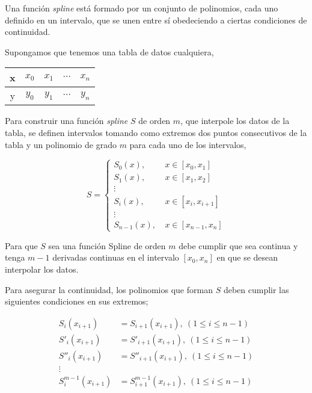 \begin{paracol}{2}
Una función \emph{spline} está formado por un conjunto de polinomios, cada uno definido en un intervalo, que se unen entre sí obedeciendo a ciertas condiciones de continuidad.

Supongamos que tenemos una tabla de datos cualquiera,
\end{paracol}
\begin{table}[h]
\centering
\begin{tabular}{c|cccc}
x&$x_0$&$x_1$&$\cdots$&$x_n$\\
\hline
y&$y_0$&$y_1$&$\cdots$&$y_n$
\end{tabular}
\end{table}
\begin{paracol}{2}
Para construir una función \emph{spline} $S$ de orden $m$, que interpole los datos de la tabla, se definen intervalos tomando como extremos dos puntos consecutivos de la tabla y un polinomio de grado $m$ para cada uno de los intervalos,
\end{paracol}
\begin{equation*}
S= \left\{ 
\begin{aligned}
S_0(x),& \ x\in [x_0,x_1]\\
S_1(x),& \ x\in [x_1,x_2]\\
\vdots \\
S_i(x),& \ x\in [x_i,x_{i+1}]\\
\vdots \\
S_{n-1}(x),& \ x\in [x_{n-1},x_n]
\end{aligned}
\right.
\end{equation*}
\begin{paracol}{2}
Para que $S$ sea una función Spline de orden $m$ debe cumplir que sea continua y tenga $m-1$ derivadas continuas en el intervalo $[x_0,x_n]$ en que se desean interpolar los datos.
   
Para asegurar la continuidad, los polinomios que forman $S$ deben cumplir las siguientes condiciones en sus extremos;
\end{paracol}
\begin{align*}
S_i(x_{i+1})&=S_{i+1}(x_{i+1}),\ (1\leq i \leq n-1)\\
S'_i(x_{i+1})&=S'_{i+1}(x_{i+1}),\ (1\leq i \leq n-1)\\
S''_i(x_{i+1})&=S''_{i+1}(x_{i+1}),\ (1\leq i \leq n-1)\\
\vdots \\
S^{m-1}_i(x_{i+1})&=S^{m-1}_{i+1}(x_{i+1}),\ (1\leq i \leq n-1)\\
\end{align*}
